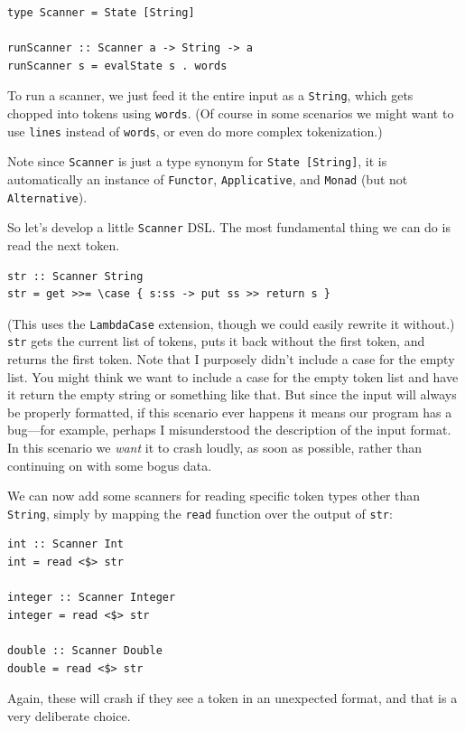 \documentclass{book}
\newcommand{\h}[1]{\texttt{#1}}
\begin{document}
\begin{verbatim}
type Scanner = State [String]

runScanner :: Scanner a -> String -> a
runScanner s = evalState s . words
\end{verbatim}

To run a scanner, we just feed it the entire input as a \h{String},
which gets chopped into tokens using \h{words}.  (Of course in some
scenarios we might want to use \h{lines} instead of \h{words}, or even do
more complex tokenization.)

Note since \h{Scanner} is just a type synonym for \h{State [String]}, it
is automatically an instance of \h{Functor}, \h{Applicative}, and
\h{Monad} (but not \h{Alternative}).

So let's develop a little \h{Scanner} DSL.  The most fundamental thing
we can do is read the next token.

\begin{verbatim}
str :: Scanner String
str = get >>= \case { s:ss -> put ss >> return s }
\end{verbatim}

(This uses the \h{LambdaCase} extension, though we
could easily rewrite it without.)  \h{str} gets the current list of
tokens, puts it back without the first token, and returns the first
token.  Note that I purposely didn't include a case for the empty
list.  You might think we want to include a case for the empty token
list and have it return the empty string or something like that.  But
since the input will always be properly formatted, if this scenario
ever happens it means our program has a bug---for example, perhaps I
misunderstood the description of the input format.  In this scenario we
\emph{want} it to crash loudly, as soon as possible, rather than
continuing on with some bogus data.

We can now add some scanners for reading specific token types other
than \h{String}, simply by mapping the \h{read} function over the output
of \h{str}:

\begin{verbatim}
int :: Scanner Int
int = read <$> str

integer :: Scanner Integer
integer = read <$> str

double :: Scanner Double
double = read <$> str
\end{verbatim}

Again, these will crash if they see a token in an unexpected format,
and that is a very deliberate choice.
\end{document}
